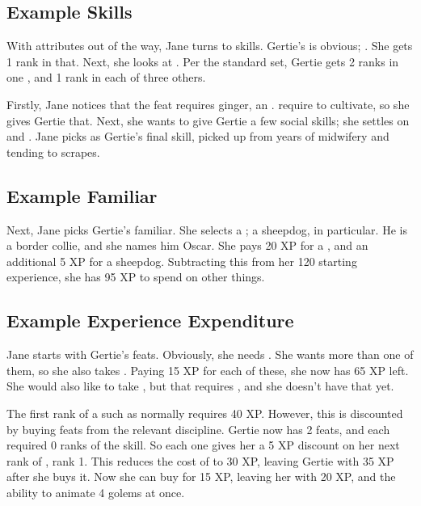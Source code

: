 
\subsection{Example Skills}

With attributes out of the way, Jane turns to skills.
Gertie's {\specialityskill} is obvious; .
She gets 1 rank in that.
Next, she looks at {\generalskills}.
Per the standard set, Gertie gets 2 ranks in one {\generalskill}, and 1 rank in each of three others.

Firstly, Jane notices that the  feat requires ginger, an .
 require  to cultivate, so she gives Gertie that.
Next, she wants to give Gertie a few social skills; she settles on  and .
Jane picks  as Gertie's final skill, picked up from years of midwifery and tending to scrapes.

\subsection{Example Familiar}

Next, Jane picks Gertie's familiar.
She selects a ; a sheepdog, in particular.
He is a border collie, and she names him Oscar.
She pays 20 XP for a , and an additional 5 XP for a sheepdog.
Subtracting this from her 120 starting experience, she has 95 XP to spend on other things.

\subsection{Example Experience Expenditure}

Jane starts with Gertie's feats.
Obviously, she needs .
She wants more than one of them, so she also takes .
Paying 15 XP for each of these, she now has 65 XP left.
She would also like to take , but that requires , and she doesn't have that yet.

The first rank of a {\disciplineskill} such as  normally requires 40 XP.
However, this is discounted by buying feats from the relevant discipline.
Gertie now has 2  feats, and each required 0 ranks of the  skill.
So each one gives her a 5 XP discount on her next rank of , rank 1.
This reduces the cost of  to 30 XP, leaving Gertie with 35 XP after she buys it.
Now she can buy  for 15 XP, leaving her with 20 XP, and the ability to animate 4 golems at once.

